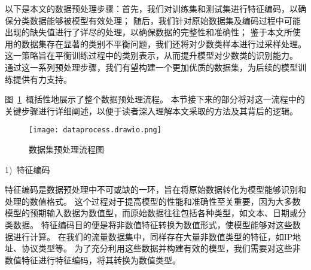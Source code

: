以下是本文的数据预处理步骤：首先，我们对训练集和测试集进行特征编码，以确保分类数据能够被模型有效处理；
随后，我们针对原始数据集及编码过程中可能出现的缺失值进行了详尽的处理，以确保数据的完整性和准确性；
鉴于本文所使用的数据集存在显著的类别不平衡问题，我们还将对少数类样本进行过采样处理。
这一策略旨在平衡训练过程中的类别表示，从而提升模型对少数类的识别能力。
通过这一系列预处理步骤，我们有望构建一个更加优质的数据集，为后续的模型训练提供有力支持。\par

图~\ref{fig:dataprocess}~概括性地展示了整个数据预处理流程。
本节接下来的部分将对这一流程中的关键步骤进行详细阐述，以便于读者深入理解本文采取的方法及其背后的逻辑。
\begin{figure}[htbp]
	\centering
	\texttt{[image: dataprocess.drawio.png]}
	\caption{数据集预处理流程图}
	\label{fig:dataprocess}
\end{figure}

1)~特征编码\par

特征编码是数据预处理中不可或缺的一环，旨在将原始数据转化为模型能够识别和处理的数值格式。
这个过程对于提高模型的性能和准确性至关重要，因为大多数模型的预期输入数据为数值型，而原始数据往往包括各种类型，如文本、日期或分类数据。
特征编码目的便是将非数值特征转换为数值形式，使模型能够对这些数据进行计算。
在我们的流量数据集中，同样存在大量非数值类型的特征，如IP地址、协议类型等。
为了充分利用这些数据并构建有效的模型，我们需要对这些非数值特征进行特征编码，将其转换为数值类型。\par

